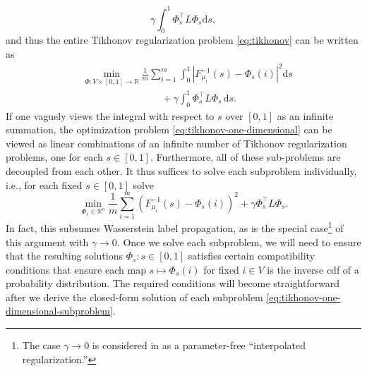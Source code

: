 \documentclass[letterpaper]{article} %
\begin{document}
\begin{equation*}
  \gamma\int_0^1\Phi_s^{\top}L\Phi_s\mathrm{d}s,
\end{equation*}
and thus the entire Tikhonov regularization problem \eqref{eq:tikhonov} can be written as
\begin{equation}\label{eq:tikhonov-one-dimensional}
  \begin{aligned}
      &\min_{\Phi:V\times \left[ 0,1 \right]\rightarrow \mathbb{R}}\frac{1}{m}\sum_{i=1}^m\int_0^1 \left| F_{\mu_i}^{-1}\left( s \right)-\Phi_s \left( i \right) \right|^2\mathrm{d}s\\
      &\qquad \qquad\qquad \qquad +\gamma\int_0^1\Phi_s^{\top}L\Phi_s\,\mathrm{d}s.
  \end{aligned}
\end{equation}
If one vaguely views the integral with respect to $s$ over $\left[ 0,1 \right]$ as an infinite summation, the optimization problem \eqref{eq:tikhonov-one-dimensional} can be viewed as linear combinations of an infinite number of Tikhonov regularization problems, one for each $s\in \left[ 0,1 \right]$. Furthermore, all of these sub-problems are decoupled from each other. It thus suffices to solve each subproblem individually, i.e., for each fixed $s\in \left[ 0,1 \right]$ solve
\begin{equation}
  \label{eq:tikhonov-one-dimensional-subproblem}
  \min_{\Phi_s\in\mathbb{R}^n}\frac{1}{m}\sum_{i=1}^m \left( F_{\mu_i}^{-1}\left( s \right)-\Phi_s \left( i \right) \right)^2+\gamma \Phi_s^{\top}L\Phi_s.
\end{equation}
In fact, this subsumes Wasserstein label propagation, as \cite[Proposition 2]{Solomon:2014} is the special case\footnote{The case $\gamma\rightarrow0$ is considered in \cite{Belkin2004} as a parameter-free ``interpolated regularization.''} of this argument with $\gamma\rightarrow 0$. Once we solve each subproblem,  we will need to ensure that the resulting solutions $\Phi_s:s\in \left[ 0,1 \right]$ satisfies certain compatibility conditions that ensure each map $s\mapsto \Phi_s \left( i \right)$ for fixed $i\in V$ is the inverse cdf of a probability distribution. The required conditions will become straightforward after we derive the closed-form solution of each subproblem \eqref{eq:tikhonov-one-dimensional-subproblem}.
\end{document}
